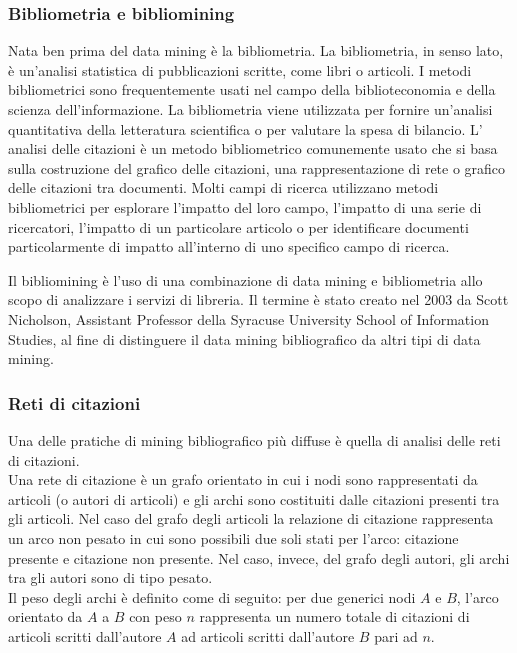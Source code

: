 \documentclass[a4paper, 12pt]{article}
\begin{document}
\subsubsection{Bibliometria e bibliomining}
Nata ben prima del data mining è la bibliometria. La bibliometria, in senso lato, è un'analisi statistica di pubblicazioni scritte, come libri o articoli. I metodi bibliometrici sono frequentemente usati nel campo della biblioteconomia e della scienza dell'informazione. La bibliometria viene utilizzata per fornire un'analisi quantitativa della letteratura scientifica o per valutare la spesa di bilancio. L' analisi delle citazioni è un metodo bibliometrico comunemente usato che si basa sulla costruzione del grafico delle citazioni, una rappresentazione di rete o grafico delle citazioni tra documenti. Molti campi di ricerca utilizzano metodi bibliometrici per esplorare l'impatto del loro campo, l'impatto di una serie di ricercatori, l'impatto di un particolare articolo o per identificare documenti particolarmente di impatto all'interno di uno specifico campo di ricerca.
\par
Il bibliomining è l'uso di una combinazione di data mining e bibliometria allo scopo di analizzare i servizi di libreria. Il termine è stato creato nel 2003 da Scott Nicholson, Assistant Professor della Syracuse University School of Information Studies, al fine di distinguere il data mining bibliografico da altri tipi di data mining.
\subsubsection{Reti di citazioni}
Una delle pratiche di mining bibliografico più diffuse è quella di analisi delle reti di citazioni. \\
Una rete di citazione è un grafo orientato in cui i nodi sono rappresentati da articoli (o autori di articoli) e gli archi sono costituiti dalle citazioni presenti tra gli articoli. Nel caso del grafo degli articoli la relazione di citazione rappresenta un arco non pesato in cui sono possibili due soli stati per l'arco: citazione presente e citazione non presente.
Nel caso, invece, del grafo degli autori, gli archi tra gli autori sono di tipo pesato. \\
Il peso degli archi è definito come di seguito: per due generici nodi $A$ e $B$, l'arco orientato da $A$ a $B$ con peso $n$ rappresenta un numero totale di citazioni di articoli scritti dall'autore $A$ ad articoli scritti dall'autore $B$ pari ad $n$.
\end{document}
